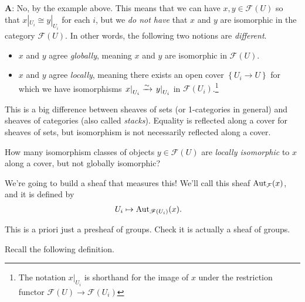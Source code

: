 \documentclass[11pt,openany]{book}
\begin{document}
\textbf{A}: No, by the example above. This means that we can have $x,y \in \mathcal{F}(U)$ so that $x|_{U_i} \cong y|_{U_i}$ for each $i$, but we \textit{do not have} that $x$ and $y$ are isomorphic in the category $\mathcal{F}(U)$. In other words, the following two notions are \textit{different}.
\begin{itemize}
    \item $x$ and $y$ agree \textit{globally}, meaning $x$ and $y$ are isomorphic in $\mathscr{F}(U)$.
    \item  $x$ and $y$ agree \textit{locally}, meaning there exists an open cover $\left\{ U_i \to U \right\}$ for which we have isomorphisms $\left. x \right|_{ U_i } \xrightarrow{\sim} \left. y \right|_{ U_i }$ in $\mathcal{F}(U_i)$.\footnote{%
    The notation $x|_{U_i}$ is shorthand for the image of $x$ under the restriction functor $\mathcal{F}(U) \to \mathcal{F}(U_i)$
    }
\end{itemize}


\begin{remark} This is a big difference between sheaves of sets (or 1-categories in general) and sheaves of categories (also called \textit{stacks}). Equality is reflected along a cover for sheaves of sets, but isomorphism is not necessarily reflected along a cover.
\end{remark}

\begin{question} How many isomorphism classes of objects $y\in \mathcal{F}(U)$ are \textit{locally isomorphic} to $x$ along a cover, but not globally isomorphic?
\end{question}

We're going to build a sheaf that measures this! We'll call this sheaf $\mathrm{Aut}_{\mathcal{F}}(x)$, and it is defined by
\begin{equation}\label{eqn:autx-torsor}
\begin{aligned}
    U_i &\mapsto \mathrm{Aut}_{\mathscr{F}(U_i)}(x).
\end{aligned}
\end{equation}
\begin{exercise} This is a priori just a presheaf of groups. Check it is actually a sheaf of groups.
\end{exercise}

Recall the following definition.
\end{document}
